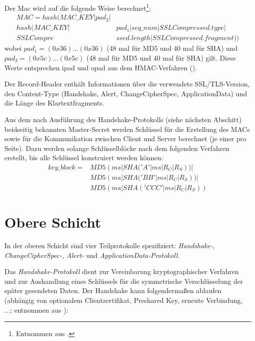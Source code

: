 \documentclass[
    12pt,
    headings=small,
    parskip=half,           %
    bibliography=totoc,
    numbers=noenddot,       %
    open=any,               %
    ]{scrreprt}
\begin{document}
Der Mac wird auf die folgende Weise berechnet\footnote{Entnommen aus \cite{eckert13}.}:
\begin{align*}
MAC = hash(MAC\_KEY | pad_2 |& \\
	hash(MAC\_KEY |& pad_1 | seq\_num | SSLCompressed.type |\\
	SSLCompre&ssed.length | SSLCompressed.fragment))
\end{align*}
wobei \(pad_1 = (0x36) \dots (0x36)\) (48 mal für MD5 und 40 mal für SHA) 
und \(pad_2 = (0x5c) \dots (0x5c)\) (48 mal für MD5 und 40 mal für SHA) gilt. Diese Werte entsprechen ipad und opad aus dem HMAC-Verfahren (\cite{hmac97}).

Der Record-Header enthält Informationen über die verwendete SSL/TLS-Version, den Content-Type (Handshake, Alert, ChangeCipherSpec, ApplicationData) und die Länge des Klartextfragments.

Aus dem nach Ausführung des Handshake-Protokolls (siehe nächsten Abschitt) beidseitig bekannten Master-Secret werden Schlüssel für die Erstellung des MACs sowie für die Kommunikation zwischen Client und Server berechnet (je einer pro Seite). Dazu werden solange Schlüsselblöcke nach dem folgenden Verfahren erstellt, bis alle Schlüssel konstruiert werden können: 
\begin{align*}
key\_block = &MD5(ms | SHA('A' | ms | R_C | R_S)) |\\
	&MD5(ms | SHA('BB' | ms | R_C | R_S)) |\\
 	&MD5(ms | SHA('CCC' | ms | R_C | R_S))
\end{align*}

\section{Obere Schicht}

In der oberen Schicht sind vier Teilprotokolle spezifiziert: \emph{Handshake-, ChangeCipherSpec-, Alert-} und \emph{ApplicationData-Protokoll}.

Das \emph{Handshake-Protokoll} dient zur Vereinbarung kryptographischer Verfahren und zur Aushandlung eines Schlüssels für die symmetrische Verschlüsselung der später gesendeten Daten. Der Handshake kann folgendermaßen ablaufen (abhängig von optionalem Clientzertifikat, Preshared Key, erneute Verbindung, ...; entnommen aus \cite{eckert13}): 
\end{document}

